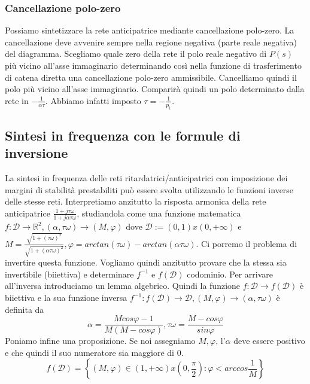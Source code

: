 \documentclass[11pt]{article}
\begin{document}
\subsubsection{Cancellazione polo-zero}
Possiamo sintetizzare la rete anticipatrice mediante cancellazione polo-zero. La cancellazione deve avvenire sempre nella regione negativa (parte reale negativa) del diagramma. Scegliamo quale zero della rete il polo reale negativo di $P(s)$ più vicino all'asse immaginario determinando così nella funzione di trasferimento di catena diretta una cancellazione polo-zero ammissibile. Cancelliamo quindi il polo più vicino all'asse immaginario. Comparirà quindi un polo determinato dalla rete in $-\frac{1}{\alpha\tau}$. Abbiamo infatti imposto $\tau=-\frac{1}{p_1}$.
\subsection{Sintesi in frequenza con le formule di inversione}
La sintesi in frequenza delle reti ritardatrici/anticipatrici con imposizione dei margini di stabilità prestabiliti può essere svolta utilizzando le funzioni inverse delle stesse reti. Interpretiamo anzitutto la risposta armonica della rete anticipatrice $\frac{1+j\tau\omega}{1+j\alpha\tau\omega}$, studiandola come una funzione matematica $f:\mathcal{D}\rightarrow \mathbb{R}^2, (\alpha,\tau\omega)\rightarrow(M,\varphi)$ dove $\mathcal{D}:=(0,1)x(0,+\infty)$ e $M=\frac{\sqrt{1+(\tau\omega)^2}}{\sqrt{1+(\alpha\tau\omega)^2}}, \varphi = arctan(\tau\omega)-arctan(\alpha\tau\omega)$. Ci porremo il problema di invertire questa funzione. Vogliamo quindi anzitutto provare che la stessa sia invertibile (biiettiva) e determinare $f^{-1}$ e $f(\mathcal{D})$ codominio. Per arrivare all'inversa introduciamo un lemma algebrico. Quindi la funzione $f:\mathcal{D}\rightarrow f(\mathcal{D})$ è biiettiva e la sua funzione inversa $f^{-1}:f(\mathcal{D})\rightarrow\mathcal{D}, (M,\varphi) \rightarrow (\alpha, \tau\omega)$ è definita da
\begin{displaymath}
    \alpha=\frac{Mcos\varphi - 1}{M(M-cos\varphi)}, \tau\omega=\frac{M-cos\varphi}{sin\varphi}
\end{displaymath}
Poniamo infine una proposizione. Se noi assegniamo $M, \varphi$, l'$\alpha$ deve essere positivo e che quindi il suo numeratore sia maggiore di 0.
\begin{displaymath}
    f(\mathcal{D}) = \left\{(M,\varphi) \in (1,+\infty)x\left(0,\frac{\pi}{2}\right):\varphi < arccos\frac{1}{M}\right\}
\end{displaymath}
\end{document}
